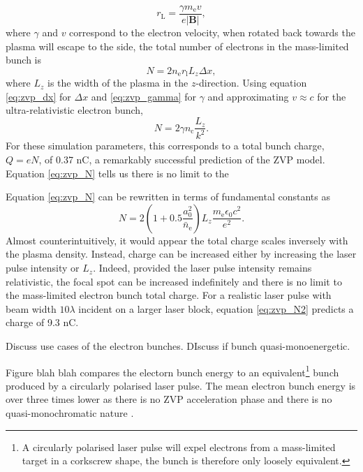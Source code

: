 \begin{equation}
	r_\mathrm{L} = \frac{\gamma m_\mathrm{e}v}{e|\mathbf{B}|},
\end{equation}
where $\gamma$ and $v$ correspond to the electron velocity, when rotated back towards the plasma will escape to the side, the total number of electrons in the mass-limited bunch is
\begin{equation}
	N = 2 n_\mathrm{e} r_\mathrm{l} L_z \Delta x,
\end{equation}
where $L_z$ is the width of the plasma in the $z$-direction. Using equation \ref{eq:zvp_dx} for $\Delta x$ and \ref{eq:zvp_gamma} for $\gamma$ and approximating $v \approx c$ for the ultra-relativistic electron bunch, 
\begin{equation}\label{eq:zvp_N}
	N = 2 \gamma n_\mathrm{c} \frac{L_z}{k^2}.
\end{equation}
For these simulation parameters, this corresponds to a total bunch charge, $Q = eN$, of 0.37 nC, a remarkably successful prediction of the ZVP model. Equation \ref{eq:zvp_N} tells us there is no limit to the 

Equation \ref{eq:zvp_N} can be rewritten in terms of fundamental constants as
\begin{equation}\label{eq:zvp_N2}
	N = 2 (1+0.5\frac{a^2_0}{\bar{n}_\mathrm{e}}) L_z \frac{m_\mathrm{e}\epsilon_0c^2}{e^2}.
\end{equation}
Almost counterintuitively, it would appear the total charge scales inversely with the plasma density. Instead, charge can be increased either by increasing the laser pulse intensity or $L_z$. Indeed, provided the laser pulse intensity remains relativistic, the focal spot can be increased indefinitely and there is no limit to the mass-limited electron bunch total charge. For a realistic laser pulse with beam width $10 \lambda$ incident on a larger laser block, equation \ref{eq:zvp_N2} predicts a charge of 9.3 nC.


Discuss use cases of the electron bunches.
DIscuss if  bunch quasi-monoenergetic.

Figure blah blah compares the electorn bunch energy to an equivalent\footnote{A circularly polarised laser pulse will expel electrons from a mass-limited target in a corkscrew shape, the bunch is therefore only loosely equivalent.} bunch produced by a circularly polarised laser pulse. The mean electron bunch energy is over three times lower as there is no ZVP acceleration phase and there is no quasi-monochromatic nature \cite{baevaZeroVectorPotential2011}. 

